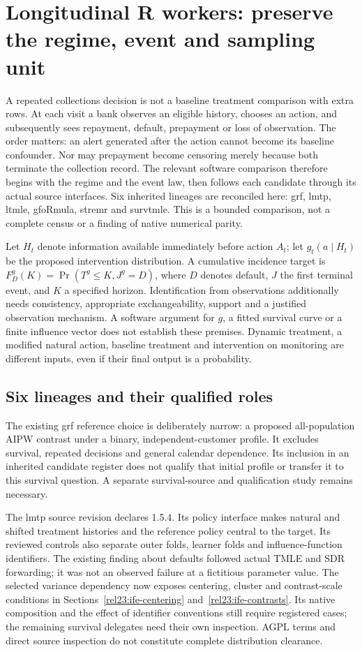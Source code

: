 
\section{Longitudinal R workers: preserve the regime, event and sampling unit}
\label{sec:exec23-longr-workers}
A repeated collections decision is not a baseline treatment comparison with
extra rows. At each visit a bank observes an eligible history, chooses an
action, and subsequently sees repayment, default, prepayment or loss of
observation. The order matters: an alert generated after the action cannot
become its baseline confounder. Nor may prepayment become censoring merely
because both terminate the collection record. The relevant software comparison
therefore begins with the regime and the event law, then follows each candidate
through its actual source interfaces. Six inherited lineages are reconciled
here: grf, lmtp, ltmle, gfoRmula, stremr and survtmle. This is a bounded comparison,
not a complete census or a finding of native numerical parity.

Let $H_t$ denote information available immediately before action $A_t$; let
$g_t(a\mid H_t)$ be the proposed intervention distribution. A cumulative
incidence target is $F_D^g(K)=\Pr(T^g\leq K,J^g=D)$, where $D$ denotes default,
$J$ the first terminal event, and $K$ a specified horizon. Identification from
observations additionally needs consistency, appropriate exchangeability,
support and a justified observation mechanism. A software argument for
$g$, a fitted survival curve or a finite influence vector does not establish
these premises. Dynamic treatment, a modified natural action, baseline
treatment and intervention on monitoring are different inputs, even if their
final output is a probability.

\subsection{Six lineages and their qualified roles}
The existing grf reference choice is deliberately narrow: a proposed
all-population AIPW contrast under a binary, independent-customer profile.
It excludes survival, repeated decisions and general calendar dependence.
Its inclusion in an inherited candidate register does not qualify that
initial profile or transfer it to this survival question. A separate
survival-source and qualification study remains necessary. \citep{exec21_grf_reuse}

The lmtp source revision declares 1.5.4. Its policy interface makes natural
and shifted treatment histories and the reference policy central to the
target. Its reviewed controls also separate outer folds, learner folds and
influence-function identifiers. The existing finding about defaults followed
actual TMLE and SDR forwarding; it was not an observed failure at a fictitious
parameter value. The selected variance dependency now exposes centering,
cluster and contrast-scale conditions in Sections~\ref{rel23:ife-centering}
and~\ref{rel23:ife-contrasts}. Its native composition and the effect of
identifier conventions still require registered cases; the remaining survival
delegates need their own inspection. AGPL terms and direct source inspection do not
constitute complete distribution clearance. \citep{exec22_lmtp_reuse}

